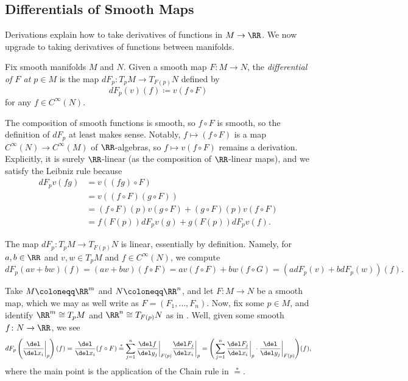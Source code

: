 \documentclass[../notes.tex]{subfiles}
\begin{document}
\subsection{Differentials of Smooth Maps}
Derivations explain how to take derivatives of functions in $M\to\RR$. We now upgrade to taking derivatives of functions between manifolds.
\begin{definition}[differential]
	Fix smooth manifolds $M$ and $N$. Given a smooth map $F\colon M\to N$, the \textit{differential of $F$ at $p\in M$} is the map $dF_p\colon T_pM\to T_{F(p)}N$ defined by
	\[dF_p(v)(f)\coloneqq v(f\circ F)\]
	for any $f\in C^\infty(N)$.
\end{definition}
\begin{remark}
	The composition of smooth functions is smooth, so $f\circ F$ is smooth, so the definition of $dF_p$ at least makes sense. Notably, $f\mapsto(f\circ F)$ is a map $C^\infty(N)\to C^\infty(M)$ of $\RR$-algebras, so $f\mapsto v(f\circ F)$ remains a derivation. Explicitly, it is surely $\RR$-linear (as the composition of $\RR$-linear maps), and we satisfy the Leibniz rule because
	\begin{align*}
		dF_pv(fg) &= v((fg)\circ F) \\
		&= v((f\circ F)(g\circ F)) \\
		&= (f\circ F)(p)v(g\circ F)+(g\circ F)(p)v(f\circ F) \\
		&= f(F(p))dF_pv(g)+g(F(p))dF_pv(f).
	\end{align*}
\end{remark}
\begin{remark} \label{rem:diff-linear}
	The map $dF_p\colon T_pM\to T_{F(p)}N$ is linear, essentially by definition. Namely, for $a,b\in\RR$ and $v,w\in T_pM$ and $f\in C^\infty(N)$, we compute
	\[dF_p(av+bw)(f)=(av+bw)(f\circ F)=av(f\circ F)+bw(f\circ G)=(adF_p(v)+bdF_p(w))(f).\]
\end{remark}
\begin{example}
	Take $M\coloneqq\RR^m$ and $N\coloneqq\RR^n$, and let $F\colon M\to N$ be a smooth map, which we may as well write as $F=(F_1,\ldots,F_n)$. Now, fix some $p\in M$, and identify $\RR^m\cong T_pM$ and $\RR^n\cong T_{F(p)}N$ as in . Well, given some smooth $f\colon N\to\RR$, we see
	\[dF_p\left(\frac{\del}{\del x_i}\bigg|_p\right)(f)=\frac{\del}{\del x_i}(f\circ F)\stackrel*=\sum_{j=1}^n\frac{\del f}{\del y_j}\bigg|_{F(p)}\frac{\del F_j}{\del x_i}\bigg|_p=\Bigg(\sum_{j=1}^n\frac{\del F_j}{\del x_i}\bigg|_p\cdot\frac{\del}{\del y_j}\bigg|_{F(p)}\Bigg)(f),\]
	where the main point is the application of the Chain rule in $\stackrel*=$.
\end{example}
\end{document}
